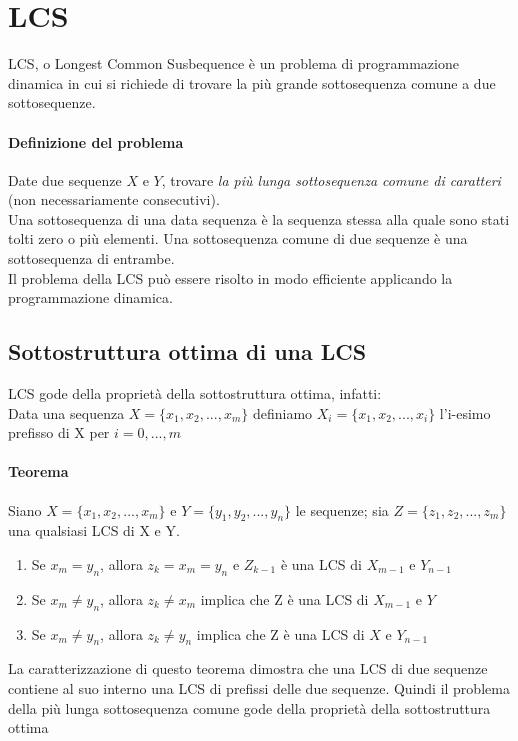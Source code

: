 \documentclass[12pt, a4paper, openany]{book}
\begin{document}
\section{LCS}
LCS, o Longest Common Susbequence è un problema di programmazione dinamica in cui si richiede di trovare la più grande sottosequenza comune a due sottosequenze.

\paragraph{Definizione del problema}
Date due sequenze $X$ e $Y$, trovare \emph{la più lunga sottosequenza comune di caratteri} (non necessariamente consecutivi).\\
Una sottosequenza di una data sequenza è la sequenza stessa alla quale sono stati tolti zero o più elementi.
Una sottosequenza comune di due sequenze è una sottosequenza di entrambe.
\\Il problema della LCS può essere risolto in modo efficiente applicando la programmazione dinamica.

\subsection*{Sottostruttura ottima di una LCS}
LCS gode della proprietà della sottostruttura ottima, infatti:
\\Data una sequenza $X=\{x_1,x_2,...,x_m\}$ definiamo $X_i=\{x_1,x_2,...,x_i\}$ l'i-esimo prefisso di X per $i = 0,...,m$
\paragraph{Teorema}
Siano $X=\{x_1,x_2,...,x_m\}$ e $Y=\{y_1,y_2,...,y_n\}$ le sequenze; sia $Z=\{z_1,z_2,...,z_m\}$ una qualsiasi LCS di X e Y.
\begin{enumerate}
	\item Se $x_m = y_n$, allora $z_k = x_m =y_n$ e $Z_{k-1}$ è  una LCS di $X_{m-1}$ e $Y_{n-1}$
	\item Se $x_m \neq y_n$, allora $z_k \neq x_m$ implica che Z è una LCS di $X_{m-1}$ e $Y$
	\item Se $x_m \neq y_n$, allora $z_k \neq y_n$ implica che Z è una LCS di $X$ e $Y_{n-1}$
\end{enumerate}
La caratterizzazione di questo teorema dimostra che una LCS di due sequenze contiene al suo interno una LCS di prefissi delle due sequenze.
Quindi il problema della più lunga sottosequenza comune gode della proprietà della sottostruttura ottima
\end{document}
